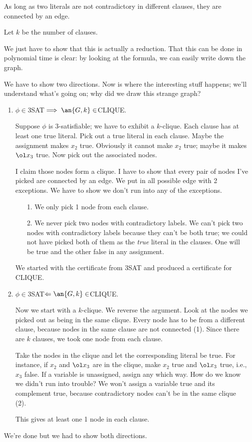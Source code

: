 \begin{ex}

As long as two literals are not contradictory in different clauses, they are connected by an edge.

Let $k$ be the number of clauses.

We just have to show that this is actually a reduction. That this can be done in polynomial time is clear: by looking at the formula, we can easily write down the graph.

We have to show two directions. Now is where the interesting stuff happens; we'll understand what's going on; why did we draw this strange graph?
\begin{enumerate}
\item
$\phi\in $3SAT$\implies\an{G,k}\in$CLIQUE.

Suppose $\phi$ is 3-satisfiable; we have to exhibit a $k$-clique. Each clause has at least one true literal. Pick out a true literal in each clause. Maybe the assignment makes $x_2$ true. Obviously it cannot make $x_2$ true; maybe it makes $\ol x_3$ true. Now pick out the associated nodes.

I claim those nodes form a clique. I have to show that every pair of nodes I've picked are connected by an edge. We put in all possible edge with 2 exceptions. We have to show we don't run into any of the exceptions.
\begin{enumerate}
\item[1.]
We only pick 1 node from each clause.
\item[2.]
We never pick two nodes with contradictory labels. We can't pick two nodes with contradictory labels because they can't be both true; we could not have picked both of them as the {\it true} literal in the clauses. One will be true and the other false in any assignment. %
\end{enumerate}
We started with the certificate from 3SAT and produced a certificate for CLIQUE.

\item
$\phi\in $3SAT$\Leftarrow\an{G,k}\in$CLIQUE.

Now we start with a $k$-clique. We reverse the argument. Look at the nodes we picked out as being in the same clique. Every node has to be from a different clause, because nodes in the same clause are not connected (1). Since there are $k$ clauses, we took one node from each clause.

Take the nodes in the clique and let the corresponding literal be true. For instance, if $x_2$ and $\ol x_3$ are in the clique,  make $x_2$ true and $\ol x_3$ true, i.e., $x_3$ false. If a variable is unassigned, assign any which way. How do we know we didn't run into trouble? We won't assign a variable true and its complement true, because contradictory nodes can't be in the same clique (2).

This gives at least one 1 node in each clause.
\end{enumerate}
We're done but we had to show both directions.
\end{ex}
